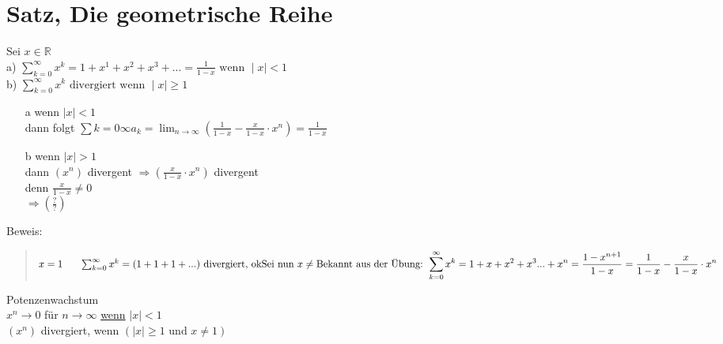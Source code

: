 \section{Satz, Die geometrische Reihe}
Sei $x \in \mathbb{R}$\\
a) $ \sum\limits_{k = 0}^{\infty} x^k = 1 + x^1 + x^2 + x^3 + ... = \frac{1}{1-x} \text{ wenn } \mid x \mid < 1$\\
b) $ \sum\limits_{k = 0}^{\infty} x^k \text{ divergiert wenn } \mid x \mid \geq 1$\\
\begin{itemize}
\item[a] {wenn $|x| < 1$\\
dann folgt $\sum{k=0}{\infty} a_k = \displaystyle\lim_{n \to \infty}(\frac{1}{1 - x} - \frac{x}{1-x} \cdot x^n) = \frac{1}{1 - x}$}
\item[b]{wenn $|x| > 1$\\
dann $(x^n)$ divergent $\Rightarrow (\frac{x}{1-x} \cdot x^n)$ divergent\\
denn $\frac{x}{1-x} \neq 0$\\
$\Rightarrow (\frac{?}{?})$}
\end{itemize}
Beweis:\\
\begin{quote}
$x = 1 \phantom{xxx} \sum_{k = 0}^{\infty} x^k = (1 + 1 + 1 +...)\text{ divergiert, ok}\\
\text{Sei nun }x \neq\\
\text{Bekannt aus der Übung: } \displaystyle\sum_{k = 0}^{\infty} x^k = 1 + x + x^2 +x^3 ... +x^n = \displaystyle\frac{1 -x^{n+1}}{1 - x} = \displaystyle\frac{1}{1 - x} - \displaystyle\frac{x}{1 - x} \cdot x^n \\ $
\end{quote}
Potenzenwachstum\\
$x^n \to 0$ für $ n \to \infty$ \underline{wenn} $|x| < 1$\\
$(x^n)$ divergiert, wenn $(|x| \geq 1 \text{ und } x \neq 1)$\\

